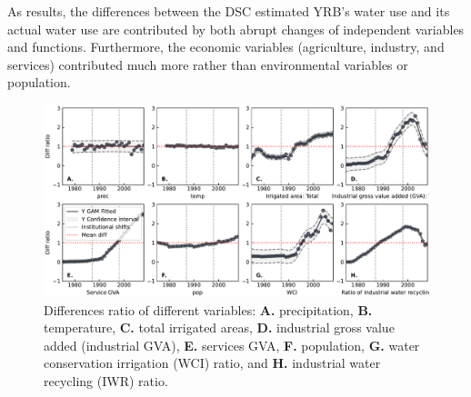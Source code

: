 As results, the differences between the DSC estimated YRB's water use and its actual water use are contributed by both abrupt changes of independent variables and functions. Furthermore, the economic variables (agriculture, industry, and services) contributed much more rather than environmental variables or population.

\begin{figure}
    \includegraphics[width=0.9\linewidth]{outputs/variables.pdf}
    \centering
    \caption{Differences ratio of different variables: \textbf{A.} precipitation, \textbf{B.} temperature, \textbf{C.} total irrigated areas, \textbf{D.} industrial gross value added (industrial GVA), \textbf{E.} services GVA, \textbf{F.} population, \textbf{G.} water conservation irrigation (WCI) ratio, and \textbf{H.} industrial water recycling (IWR) ratio.}
    \label{fig:variables}
\end{figure}









